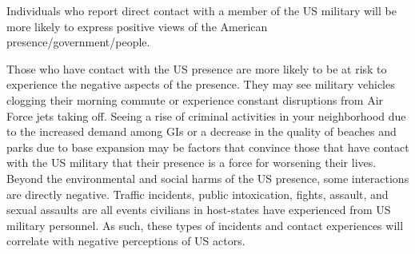 \begin{subhyp}
	
	\begin{hyp}
		Individuals who report direct contact with a member of the US military will be more likely to express positive views of the American presence/government/people. 
	\end{hyp}
	
	Those who have contact with the US presence are more likely to be at risk to experience the negative aspects of the presence. They may see military vehicles clogging their morning commute or experience constant disruptions from Air Force jets taking off. Seeing a rise of criminal activities in your neighborhood due to the increased demand among GIs or a decrease in the quality of beaches and parks due to base expansion may be factors that convince those that have contact with the US military that their presence is a force for worsening their lives. Beyond the environmental and social harms of the US presence, some interactions are directly negative. Traffic incidents, public intoxication, fights, assault, and sexual assaults are all events civilians in host-states have experienced from US military personnel. As such, these types of incidents and contact experiences will correlate with negative perceptions of US actors.
	

\end{subhyp}
